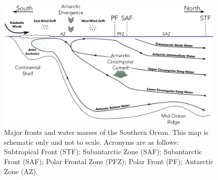 \begin{figure}
  \centering
  \includegraphics[width=\textwidth]{../introduction/oceanographymap.png}
  \caption[Major fronts and water masses of the Southern Ocean]{Major fronts and water masses of the Southern Ocean.
  This map is schematic only and not to scale.
  Acronyms are as follows: Subtropical Front (STF); Subantarctic Zone (SAF); Subantarctic Front (SAF); Polar Frontal Zone (PFZ); Polar Front (PF); Antarctic Zone (AZ).}
  \label{fig:oceanographymap}
\end{figure}
